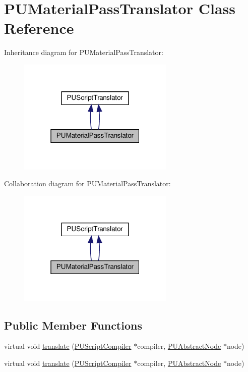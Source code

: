 \hypertarget{classPUMaterialPassTranslator}{}\section{P\+U\+Material\+Pass\+Translator Class Reference}
\label{classPUMaterialPassTranslator}


Inheritance diagram for P\+U\+Material\+Pass\+Translator\+:
\nopagebreak
\begin{figure}[H]
\begin{center}
\leavevmode
\includegraphics[width=211pt]{classPUMaterialPassTranslator__inherit__graph}
\end{center}
\end{figure}


Collaboration diagram for P\+U\+Material\+Pass\+Translator\+:
\nopagebreak
\begin{figure}[H]
\begin{center}
\leavevmode
\includegraphics[width=211pt]{classPUMaterialPassTranslator__coll__graph}
\end{center}
\end{figure}
\subsection*{Public Member Functions}
\begin{DoxyCompactItemize}
\item 
virtual void \hyperlink{classPUMaterialPassTranslator_a712a3e8bd5191c11f8bacd7c1e1e790a}{translate} (\hyperlink{classPUScriptCompiler}{P\+U\+Script\+Compiler} $\ast$compiler, \hyperlink{classPUAbstractNode}{P\+U\+Abstract\+Node} $\ast$node)
\item 
virtual void \hyperlink{classPUMaterialPassTranslator_a8da82728ce6e1aa0c1a57b70e19b1c2b}{translate} (\hyperlink{classPUScriptCompiler}{P\+U\+Script\+Compiler} $\ast$compiler, \hyperlink{classPUAbstractNode}{P\+U\+Abstract\+Node} $\ast$node)
\end{DoxyCompactItemize}
